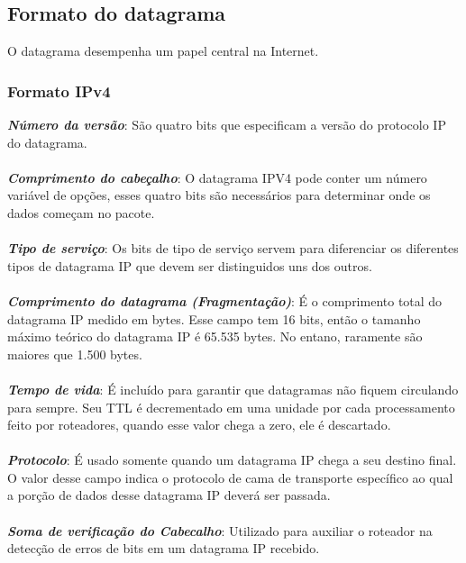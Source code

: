 \documentclass[a4paper, 12pt]{article}
\begin{document}
    \subsection{Formato do datagrama}
    O datagrama desempenha um papel central na Internet.

        \subsubsection{Formato IPv4}
            \textbf{\textit{Número da versão}}: São quatro bits que especificam a versão do protocolo IP do datagrama.
            \\\\
            \textbf{\textit{Comprimento do cabeçalho}}: O datagrama IPV4 pode conter um número variável de opções, esses quatro bits
            são necessários para determinar onde os dados começam no pacote.
            \\\\
            \textbf{\textit{Tipo de serviço}}: Os bits de tipo de serviço servem para diferenciar os diferentes tipos de datagrama IP
            que devem ser distinguidos uns dos outros.
            \\\\
            \textbf{\textit{Comprimento do datagrama (Fragmentação)}}:
            É o comprimento total do datagrama IP medido em bytes. Esse campo tem 16 bits, então o tamanho máximo teórico do datagrama
            IP é 65.535 bytes. No entano, raramente são maiores que 1.500 bytes.
            \\\\
            \textbf{\textit{Tempo de vida}}: É incluído para garantir que datagramas não fiquem circulando para sempre. Seu TTL é 
            decrementado em uma unidade por cada processamento feito por roteadores, quando esse valor chega a zero, ele é descartado.
            \\\\
            \textbf{\textit{Protocolo}}: É usado somente quando um datagrama IP chega a seu destino final. O valor desse campo indica
            o protocolo de cama de transporte específico ao qual a porção de dados desse datagrama IP deverá ser passada.
            \\\\
            \textbf{\textit{Soma de verificação do Cabecalho}}: Utilizado para auxiliar o roteador na detecção de erros de bits em
            um datagrama IP recebido.
            \\\\
\end{document}
